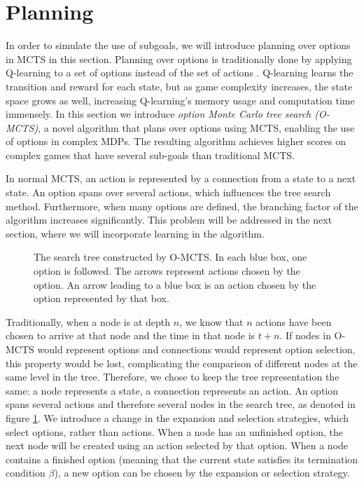 \section{Planning}
\label{sec:planning}


In order to simulate the use of subgoals, we will introduce planning over
options in MCTS in this section. Planning over options is traditionally done by
applying Q-learning to a set of options instead of the set of actions
\cite{sutton1999between}. Q-learning learns the transition and reward for each
state, but as game complexity increases, the state space grows as well,
increasing Q-learning's memory usage and computation time immensely. In this
section we introduce \emph{option Monte Carlo tree search (O-MCTS)}, a novel
algorithm that plans over options using MCTS, enabling the use of options in
complex MDPs.  The resulting algorithm achieves higher scores on complex games
that have several sub-goals than traditional MCTS.

In normal MCTS, an action is represented by a connection from a state to a next
state. An option spans over several actions, which influences the tree search
method. Furthermore, when many options are defined, the branching factor of the
algorithm increases significantly. This problem will be addressed in the next
section, where we will incorporate learning in the algorithm.

\begin{figure}
	\centering
	\caption{The search tree constructed by O-MCTS. In each blue box, one option
	is followed. The arrows represent actions chosen by the option. An arrow
leading to a blue box is an action chosen by the option represented by that box.}
	\label{fig:omcts-tree}
\end{figure}

Traditionally, when a node is at depth $n$, we know that $n$ actions have been
chosen to arrive at that node and the time in that node is $t+n$. If nodes in
O-MCTS would represent options and connections would represent option selection,
this property would be lost, complicating the comparison of different nodes at
the same level in the tree. Therefore, we chose to keep the tree representation
the same: a node represents a state, a connection represents an action. An
option spans several actions and therefore several nodes in the search tree, as
denoted in figure \ref{fig:omcts-tree}. We introduce a change in the expansion
and selection strategies, which select options, rather than actions. When a node
has an unfinished option, the next node will be created using an action selected
by that option. When a node contains a finished option (meaning that the current
state satisfies its termination condition $\beta$), a new option can be chosen
by the expansion or selection strategy.

